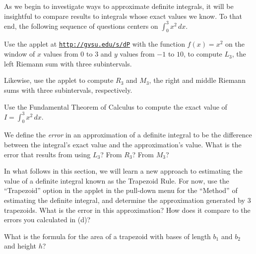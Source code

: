 \begin{pa} \label{PA:5.6}
As we begin to investigate ways to approximate definite integrals, it will be insightful to compare results to integrals whose exact values we know.  To that end, the following sequence of questions centers on $\int_0^3 x^2 \, dx$. 
\ba
	\item Use the applet at \href{http://gvsu.edu/s/dP}{\texttt{http://gvsu.edu/s/dP}} with the function $f(x) = x^2$ on the window of $x$ values from $0$ to $3$ and $y$ values from $-1$ to $10$, to compute $L_3$, the left Riemann sum with three subintervals.
	\item Likewise, use the applet to compute $R_3$ and $M_3$, the right and middle Riemann sums with three subintervals, respectively.
	\item Use the Fundamental Theorem of Calculus to compute the exact value of $I = \int_0^3 x^2 \, dx$.
	\item We define the \emph{error} in an approximation of a definite integral to be the difference between the integral's exact value and the approximation's value.  What is the error that results from using $L_3$? From $R_3$?  From $M_3$?
	\item In what follows in this section, we will learn a new approach to estimating the value of a definite integral known as the Trapezoid Rule.  For now, use the ``Trapezoid'' option  in the applet in the pull-down menu for the ``Method'' of estimating the definite integral, and determine the approximation generated by 3 trapezoids.  What is the error in this approximation?  How does it compare to the errors you calculated in (d)?
	\item What is the formula for the area of a trapezoid with bases of length $b_1$ and $b_2$ and height $h$?
\ea
\end{pa} 
\afterpa